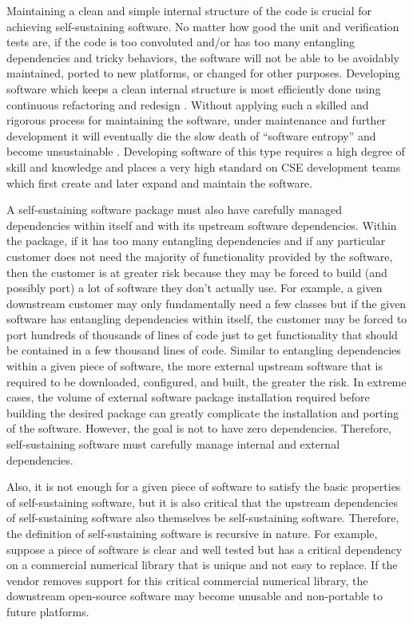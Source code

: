 \documentclass[11pt]{SANDreport}
\begin{document}
Maintaining a clean and simple internal structure of the code is crucial for achieving self-sustaining software.  No matter how good the unit and verification tests are, if the code is too convoluted and/or has too many entangling dependencies and tricky behaviors, the software will not be able to be avoidably maintained, ported to new platforms, or changed for other purposes.  Developing software which keeps a clean internal structure is most efficiently done using continuous refactoring and redesign {}\cite{XP2}.  Without applying such a skilled and rigorous process for maintaining the software, under maintenance and further development it will eventually die the slow death of ``software entropy'' and become unsustainable {}\cite{MythicalManMonth95}.  Developing software of this type requires a high degree of skill and knowledge and places a very high standard on CSE development teams which first create and later expand and maintain the software.

A self-sustaining software package must also have carefully managed dependencies within itself and with its upstream software dependencies.  Within the package, if it has too many entangling dependencies and if any particular customer does not need the majority of functionality provided by the software, then the customer is at greater risk because they may be forced to build (and possibly port) a lot of software they don't actually use.  For example, a given downstream customer may only fundamentally need a few classes but if the given software has entangling dependencies within itself, the customer may be forced to port hundreds of thousands of lines of code just to get functionality that should be contained in a few thousand lines of code.  Similar to entangling dependencies within a given piece of software, the more external upstream software that is required to be downloaded, configured, and built, the greater the risk.  In extreme cases, the volume of external software package installation required before building the desired package can greatly complicate the installation and porting of the software.  However, the goal is not to have zero dependencies.  Therefore, self-sustaining software must carefully manage internal and external dependencies.

Also, it is not enough for a given piece of software to satisfy the basic properties of self-sustaining software, but it is also critical that the upstream dependencies of self-sustaining software also themselves be self-sustaining software. Therefore, the definition of self-sustaining software is recursive in nature.  For example, suppose a piece of software is clear and well tested but has a critical dependency on a commercial numerical library that is unique and not easy to replace.  If the vendor removes support for this critical commercial numerical library, the downstream open-source software may become unusable and non-portable to future platforms.
\end{document}
